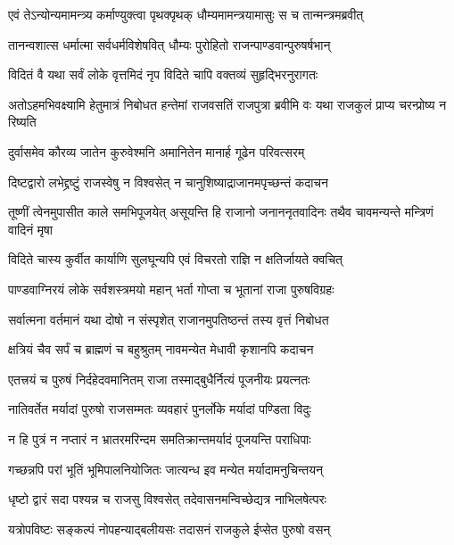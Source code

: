 
\twolineshloka
{एवं तेऽन्योन्यमामन्त्र्य कर्माण्युक्त्वा पृथक्पृथक्}
{धौम्यमामन्त्रयामासुः स च तान्मन्त्रमब्रवीत्}


\twolineshloka
{तानन्वशात्स धर्मात्मा सर्वधर्मविशेषवित्}
{धौम्यः पुरोहितो राजन्पाण्डवान्पुरुषर्षभान्}




\twolineshloka
{विदितं वै यथा सर्वं लोके वृत्तमिदं नृप}
{विदिते चापि वक्तव्यं सुहृद्भिरनुरागतः}


\threelineshloka
{अतोऽहमभिवक्ष्यामि हेतुमात्रं निबोधत}
{हन्तेमां राजवसतिं राजपुत्रा ब्रवीमि वः}
{यथा राजकुलं प्राप्य चरन्प्रोष्य न रिष्यति}


\twolineshloka
{दुर्वासमेव कौरव्य जातेन कुरुवेश्मनि}
{अमानितेन मानार्ह गूढेन परिवत्सरम्}


\twolineshloka
{दिष्टद्वारो लभेद्द्रष्टुं राजस्वेषु न विश्वसेत्}
{न चानुशिष्याद्राजानमपृच्छन्तं कदाचन}


\onelineshloka
{तूष्णीं त्वेनमुपासीत काले समभिपूजयेत्}
\twolineshloka
{असूयन्ति हि राजानो जनाननृतवादिनः}
{तथैव चावमन्यन्ते मन्त्रिणं वादिनं मृषा}


\twolineshloka
{विदिते चास्य कुर्वीत कार्याणि सुलघून्यपि}
{एवं विचरतो राज्ञि न क्षतिर्जायते क्वचित्}


\twolineshloka
{पाण्डवाग्निरयं लोके सर्वशस्त्रमयो महान्}
{भर्ता गोप्ता च भूतानां राजा पुरुषविग्रहः}


\twolineshloka
{सर्वात्मना वर्तमानं यथा दोषो न संस्पृशेत्}
{राजानमुपतिष्ठन्तं तस्य वृत्तं निबोधत}


\twolineshloka
{क्षत्रियं चैव सर्पं च ब्राह्मणं च बहुश्रुतम्}
{नावमन्येत मेधावी कृशानपि कदाचन}


\twolineshloka
{एतत्त्रयं च पुरुषं निर्दहेदवमानितम्}
{राजा तस्माद्बुधैर्नित्यं पूजनीयः प्रयत्नतः}


\twolineshloka
{नातिवर्तेत मर्यादां पुरुषो राजसम्मतः}
{व्यवहारं पुनर्लोके मर्यादां पण्डिता विदुः}


\twolineshloka
{न हि पुत्रं न नप्तारं न भ्रातरमरिन्दम}
{समतिक्रान्तमर्यादं पूजयन्ति पराधिपाः}


\twolineshloka
{गच्छन्नपि परां भूतिं भूमिपालनियोजितः}
{जात्यन्ध इव मन्येत मर्यादामनुचिन्तयन्}


\twolineshloka
{धृष्टो द्वारं सदा पश्यन्न च राजसु विश्वसेत्}
{तदेवासनमन्विच्छेद्यत्र नाभिलषेत्परः}


\twolineshloka
{यत्रोपविष्टः सङ्कल्पं नोपहन्याद्बलीयसः}
{तदासनं राजकुले ईप्सेत पुरुषो वसन्}


